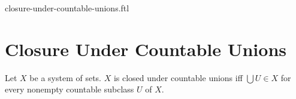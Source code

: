 \documentclass{naproche-library}
\begin{document}
\begin{smodule}{closure-under-countable-unions.ftl}

  \section*{Closure Under Countable Unions}

  \begin{definition}[forthel,id=FOUNDATIONS_14_2377279311183872,printid]
    Let $X$ be a system of sets.
    $X$ is closed under countable unions iff $\bigcup U \in X$ for every nonempty countable subclass $U$ of $ X$.
  \end{definition}
\end{smodule}
\end{document}
